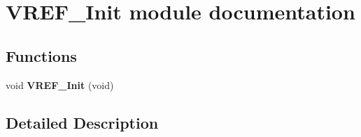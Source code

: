 \hypertarget{group___v_r_e_f___init__module}{}\section{V\+R\+E\+F\+\_\+\+Init module documentation}
\label{group___v_r_e_f___init__module}
\subsection*{Functions}
\begin{DoxyCompactItemize}
\item 
void {\bfseries V\+R\+E\+F\+\_\+\+Init} (void)\hypertarget{group___v_r_e_f___init__module_ga5f84766ab2ea4b94bbd6b98626a36c2b}{}\label{group___v_r_e_f___init__module_ga5f84766ab2ea4b94bbd6b98626a36c2b}

\end{DoxyCompactItemize}


\subsection{Detailed Description}
